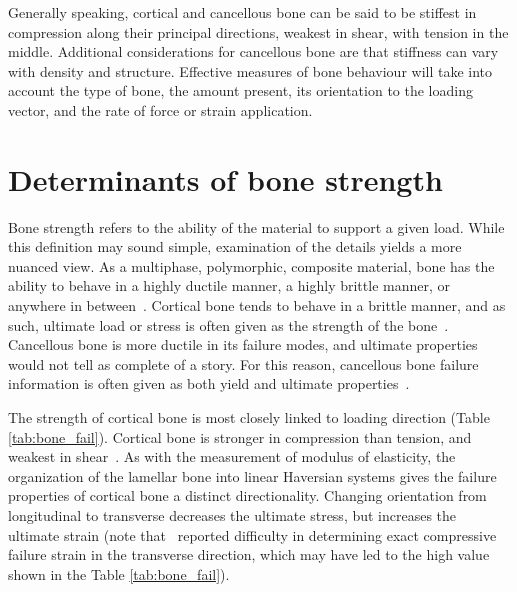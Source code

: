 Generally speaking, cortical and cancellous bone can be said to be stiffest in compression along their principal directions, weakest in shear, with tension in the middle.
Additional considerations for cancellous bone are that stiffness can vary with density and structure.
Effective measures of bone behaviour will take into account the type of bone, the amount present, its orientation to the loading vector, and the rate of force or strain application.

\section{Determinants of bone strength}
\label{sec:intro_boneStrength}
Bone strength refers to the ability of the material to support a given load.
While this definition may sound simple, examination of the details yields a more nuanced view.
As a multiphase, polymorphic, composite material, bone has the ability to behave in a highly ductile manner, a highly brittle manner, or anywhere in between~\citep{hayes_biomechanics_1997}.
Cortical bone tends to behave in a brittle manner, and as such, ultimate load or stress is often given as the strength of the bone~\citep{hayes_biomechanics_1997, reilly_elastic_1975}.
Cancellous bone is more ductile in its failure modes, and ultimate properties would not tell as complete of a story.
For this reason, cancellous bone failure information is often given as both yield and ultimate properties~\citep{turner_fabric_1990,lotz_mechanical_1991, williams_properties_1982, rincon-kohli_multi-axial_2009}.

The strength of cortical bone is most closely linked to loading direction (Table \ref{tab:bone_fail}).
Cortical bone is stronger in compression than tension, and weakest in shear~\citep{reilly_elastic_1975}. 	
As with the measurement of modulus of elasticity, the organization of the lamellar bone into linear Haversian systems gives the failure properties of cortical bone a distinct directionality.
Changing orientation from longitudinal to transverse decreases the ultimate stress, but increases the ultimate strain (note that~\citet{reilly_elastic_1975} reported difficulty in determining exact compressive failure strain in the transverse direction, which may have led to the high value shown in the Table \ref{tab:bone_fail}).

